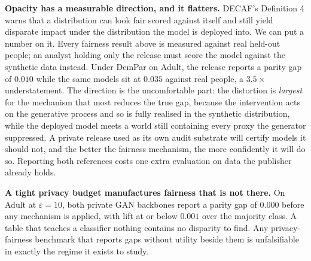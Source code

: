 {\textbf{Opacity has a measurable direction, and it flatters.} DECAF's Definition 4
warns that a distribution can look fair scored against itself and still yield
disparate impact under the distribution the model is deployed into. We can put a
number on it. Every fairness result above is measured against real held-out
people; an analyst holding only the release must score the model against the
synthetic data instead. Under DemPar on Adult, the release reports a parity gap of
$0.010$ while the same models sit at $0.035$ against real people, a $3.5\times$
understatement. The direction is the uncomfortable part: the distortion is
\emph{largest} for the mechanism that most reduces the true gap, because the
intervention acts on the generative process and so is fully realised in the
synthetic distribution, while the deployed model meets a world still containing
every proxy the generator suppressed. A private release used as its own audit
substrate will certify models it should not, and the better the fairness
mechanism, the more confidently it will do so. Reporting both references costs one
extra evaluation on data the publisher already holds.

\textbf{A tight privacy budget manufactures fairness that is not there.} On Adult
at $\varepsilon{=}10$, both private GAN backbones report a parity gap of $0.000$
before any mechanism is applied, with lift at or below $0.001$ over the majority
class. A table that teaches a classifier nothing contains no disparity to find.
Any privacy-fairness benchmark that reports gaps without utility beside them is
unfalsifiable in exactly the regime it exists to study.%
}
